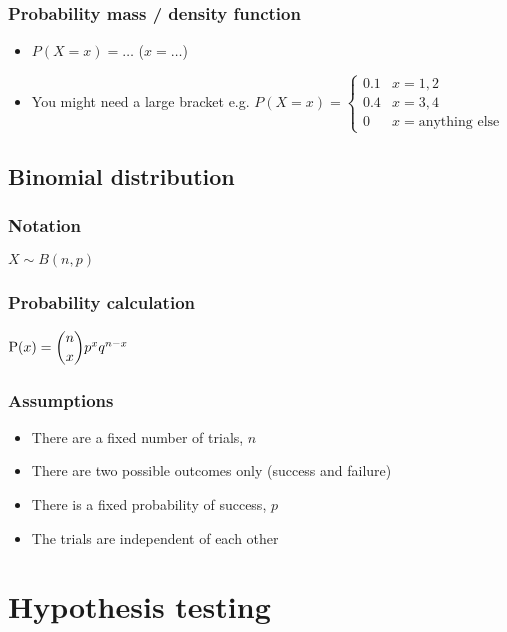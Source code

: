 \subsection{Probability mass / density function}
\begin{itemize}
	\item $P(X=x) = \dots$ ($x=\dots$)
	\item You might need a large bracket e.g. \begin{math}
		P(X=x) = \begin{cases}
			0.1 & x=1, 2\\
			0.4 & x=3, 4\\
			0 & x=\text{anything else}
		\end{cases}  
	\end{math}
\end{itemize}

\section{Binomial distribution}
\subsection{Notation}
$X \sim B(n,p)$
\subsection{Probability calculation}
$\text{P}(x) = \dbinom{n}{x} p^x q^{n-x}$
\subsection{Assumptions}
\begin{itemize}
	\item There are a fixed number of trials, $n$
	\item There are two possible outcomes only (success and failure)
	\item There is a fixed probability of success, $p$
	\item The trials are independent of each other
\end{itemize}







\chapter{Hypothesis testing}
